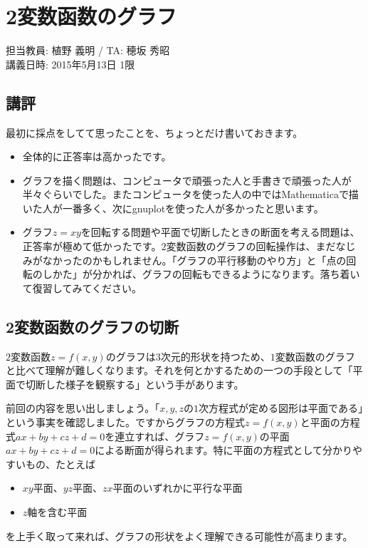 \chapter{2変数函数のグラフ}

\begin{flushright}
担当教員: 植野 義明 / TA: 穂坂 秀昭 \\
講義日時: 2015年5月13日 1限
\end{flushright}

\section{講評}

最初に採点をしてて思ったことを、ちょっとだけ書いておきます。\vspace{-0.5zw}
\begin{itemize}
\item 全体的に正答率は高かったです。
\item グラフを描く問題は、コンピュータで頑張った人と手書きで頑張った人が半々ぐらいでした。またコンピュータを使った人の中ではMathematicaで描いた人が一番多く、次にgnuplotを使った人が多かったと思います。
\item グラフ$z = xy$を回転する問題や平面で切断したときの断面を考える問題は、正答率が極めて低かったです。$2$変数函数のグラフの回転操作は、まだなじみがなかったのかもしれません。「グラフの平行移動のやり方」と「点の回転のしかた」が分かれば、グラフの回転もできるようになります。落ち着いて復習してみてください。
\end{itemize}\vspace{-2zw}

\section{2変数函数のグラフの切断}

$2$変数函数$z = f(x, y)$のグラフは$3$次元的形状を持つため、$1$変数函数のグラフと比べて理解が難しくなります。それを何とかするための一つの手段として「平面で切断した様子を観察する」という手があります。

前回の内容を思い出しましょう。「$x, y, z$の$1$次方程式が定める図形は平面である」という事実を確認しました。ですからグラフの方程式$z = f(x, y)$と平面の方程式$ax + by + cz + d = 0$を連立すれば、グラフ$z = f(x, y)$の平面$ax + by + cz + d=0$による断面が得られます。特に平面の方程式として分かりやすいもの、たとえば\vspace{-0.5zw}
\begin{itemize}
\item $xy$平面、$yz$平面、$zx$平面のいずれかに平行な平面
\item $z$軸を含む平面
\end{itemize}\vspace{-0.5zw}
を上手く取って来れば、グラフの形状をよく理解できる可能性が高まります。\vspace{-0.5zw}

